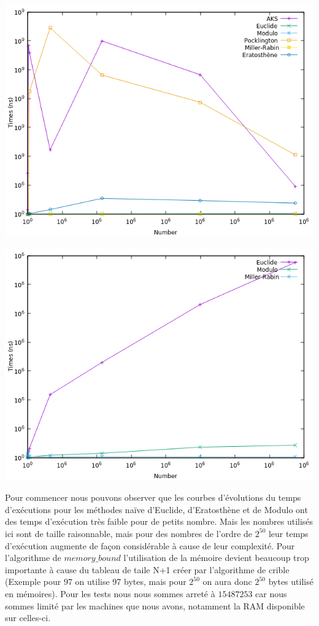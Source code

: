 		\begin{center}\includegraphics[scale=0.6]{result.png}\end{center}
		\begin{center}\includegraphics[scale=0.6]{result2.png}\end{center}
	
	Pour commencer nous pouvons observer que les courbes d'évolutions du temps d'exécutions pour les méthodes naïve d'Euclide, d'Eratosthène et de Modulo ont des temps d'exécution très faible pour de petits nombre. Mais les nombres utilisés ici sont de taille raisonnable, mais pour des nombres de l'ordre de $2^{50}$ leur temps d'exécution augmente de façon considérable à cause de leur complexité. Pour l'algorithme de $memory\_bound$ l'utilisation de la mémoire devient beaucoup trop importante à cause du tableau de taile N+1 créer par l'algorithme de crible (Exemple pour 97 on utilise 97 bytes, mais pour $2^{50}$ on aura donc $2^{50}$ bytes utilisé en mémoires). Pour les tests nous nous sommes arreté à $15487253$ car nous sommes limité par les machines que nous avons, notamment la RAM disponible sur celles-ci.\\	
	
